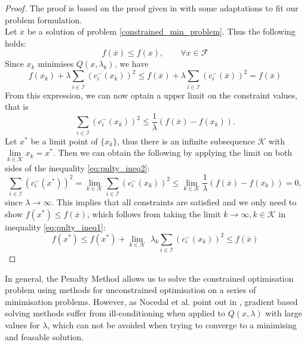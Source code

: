 \begin{proof}
	The proof is based on the proof given in \cite{NoceWrig06} with some adaptations to fit our problem formulation.\\
	Let $\overline{x}$ be a solution of problem \ref{constrained_min_problem}. Thus the following holds: \[ f(\overline{x}) \leq f(x), \qquad \forall x \in \mathcal{F}\]
	Since $x_k$ minimises $Q(x, \lambda_k)$, we have 
	\begin{equation}
	\label{eq:pnlty_ineq1}
	f(x_k) + \lambda \sum_{i \in \mathcal{I}} (c_i^{-}(x_k))^2 \leq 
	f(\overline{x}) + \lambda \sum_{i \in \mathcal{I}} (c_i^{-}(\overline{x}))^2 =
	f(\overline{x})
	\end{equation}
	From this expression, we can now optain a upper limit on the constraint values, that is
	\begin{equation}
	\label{eq:pnlty_ineq2}
	\sum_{i \in \mathcal{I}} (c_i^{-}(x_k))^2 \leq \frac{1}{\lambda} (f(\overline{x}) - f(x_k)).
	\end{equation}
	Let $x^*$ be a limit point of $\{x_k\}$, thus there is an infinite subsequence $\mathcal{K}$ with $\underset{k \in \mathcal{K}}{\lim} x_k = x^*$. Then we can obtain the following by applying the limit on both sides of the inequality \ref{eq:pnlty_ineq2}:
	\[ 
	\sum_{i \in \mathcal{I}} (c_i^{-}(x^*))^2 = 
	\underset{k \in \mathcal{K}}{\lim} \sum_{i \in \mathcal{I}} (c_i^{-}(x_k))^2 \leq
	\underset{k \in \mathcal{K}}{\lim} \frac{1}{\lambda} (f(\overline{x}) - f(x_k)) = 0,
	 \]
	 since $\lambda \to \infty$. This implies that all constraints are satisfied and we only need to show $f(x^*) \leq f(\overline{x})$, which follows from taking the limit $k \to \infty, k \in \mathcal{K}$ in inequality \ref{eq:pnlty_ineq1}:
	 \[ f(x^*) \leq f(x^*) +  \underset{k \in \mathcal{K}}{\lim} \,\,\lambda_k \sum_{i \in \mathcal{I}} (c_i^{-}(x_k))^2 \leq f(\overline{x})\]
\end{proof}

In general, the Penalty Method allows us to solve the constrained optimisation problem using methods for unconstrained optimisation on a series of minimisation problems. However, as Nocedal et al. point out in \cite{NoceWrig06}, gradient based solving methods suffer from ill-conditioning when applied to $Q(x, \lambda)$ with large values for $\lambda$, which can not be avoided when trying to converge to a minimising and feasable solution.

